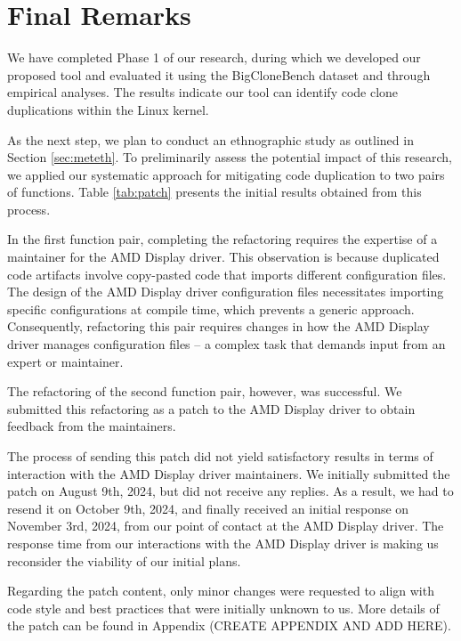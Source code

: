 \en

\section{Final Remarks}

We have completed Phase 1 of our research, during which we developed our proposed tool and evaluated it using the BigCloneBench dataset and through empirical analyses. The results indicate our tool can identify code clone duplications within the Linux kernel.

As the next step, we plan to conduct an ethnographic study as outlined in Section \ref{sec:meteth}. To preliminarily assess the potential impact of this research, we applied our systematic approach for mitigating code duplication to two pairs of functions. Table \ref{tab:patch} presents the initial results obtained from this process.



In the first function pair, completing the refactoring requires the expertise of a maintainer for the AMD Display driver. This observation is because duplicated code artifacts involve copy-pasted code that imports different configuration files. The design of the AMD Display driver configuration files necessitates importing specific configurations at compile time, which prevents a generic approach. Consequently, refactoring this pair requires changes in how the AMD Display driver manages configuration files -- a complex task that demands input from an expert or maintainer.

The refactoring of the second function pair, however, was successful. 
We submitted this refactoring as a patch to the AMD Display driver to obtain feedback 
from the maintainers. 

The process of sending this patch did not yield satisfactory results in terms of 
interaction with the AMD Display driver maintainers. We initially submitted the 
patch on August 9th, 2024, but did not receive any replies. As a result, we had 
to resend it on October 9th, 2024, and finally received an initial response on 
November 3rd, 2024, from our point of contact at the AMD Display driver. 
The response time from our interactions with the AMD Display driver is making 
us reconsider the viability of our initial plans.

Regarding the patch content, only minor changes were requested to align with code 
style and best practices that were initially unknown to us. More details of the 
patch can be found in Appendix (CREATE APPENDIX AND ADD HERE).


